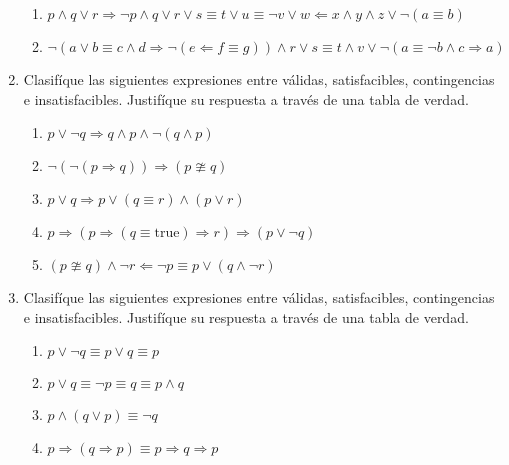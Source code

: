 \documentclass{article}
\begin{document}
\begin{enumerate}
\begin{enumerate}
		\item $p \land q \lor r \Rightarrow \neg p \land q \lor r \lor s \equiv t \lor u \equiv \neg v \lor w \Leftarrow x \land y \land z \lor \neg(a \equiv b)$
		
		\item $\neg(a \lor b \equiv c \land d \Rightarrow \neg(e \Leftarrow f \equiv g)) \land r \lor s \equiv t \land v \lor \neg(a \equiv \neg b \land c \Rightarrow a)$
		
	\end{enumerate}

	\item Clasifíque las siguientes expresiones entre válidas, satisfacibles, contingencias e insatisfacibles.
	Justifíque su respuesta a través de una tabla de verdad.

	\begin{enumerate}
		\item $p \lor \neg q \Rightarrow q \land p \land \neg(q \land p)$

		\item $\neg(\neg(p \Rightarrow q)) \Rightarrow (p \ncong q)$

		\item $p \lor q \Rightarrow p \lor (q \equiv r) \land (p \lor r)$

		\item $p \Rightarrow (p \Rightarrow (q \equiv \text{true}) \Rightarrow r) \Rightarrow (p \lor \neg q)$

		\item $(p \ncong q) \land \neg r \Leftarrow \neg p \equiv p \lor (q \land \neg r)$
	\end{enumerate}

	\item Clasifíque las siguientes expresiones entre válidas, satisfacibles, contingencias e insatisfacibles.
	Justifíque su respuesta a través de una tabla de verdad.

	\begin{enumerate}
		\item $p \lor \neg q \equiv p \lor q \equiv p$

		\item $p \lor q \equiv \neg p \equiv q \equiv p \land q$

		\item $p \land (q \lor p) \equiv \neg q$

		\item $p \Rightarrow (q \Rightarrow p) \equiv p \Rightarrow q \Rightarrow p$ 
	\end{enumerate}


\end{enumerate}
\end{document}
